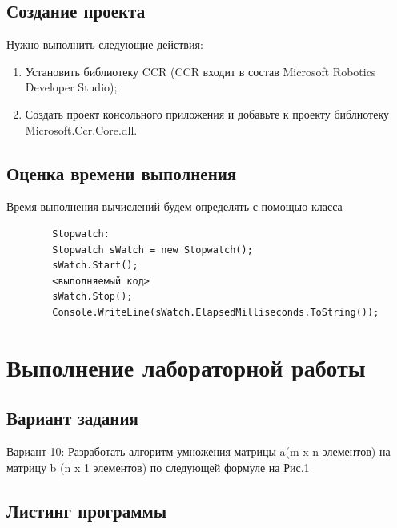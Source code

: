 \documentclass[russian,utf8,pointsection]{eskdtext}
\begin{document}
       \subsection{Создание проекта}
       Нужно выполнить следующие действия:
       \begin{enumerate}
       \item Установить библиотеку CCR (CCR входит в состав Microsoft Robotics Developer Studio);
       \item Создать проект консольного приложения и добавьте к проекту библиотеку Microsoft.Ccr.Core.dll.
       	\end{enumerate}
       	
       	\subsection{Оценка времени выполнения}
       	Время выполнения вычислений будем определять с помощью класса
       	\begin{lstlisting}
       	Stopwatch:       	
       	Stopwatch sWatch = new Stopwatch();       	
       	sWatch.Start();       	
       	<выполняемый код>       	
       	sWatch.Stop();       	
       	Console.WriteLine(sWatch.ElapsedMilliseconds.ToString());
       	      	\end{lstlisting}
       	
       	\section{Выполнение лабораторной работы}
       		\subsection{Вариант задания}
       		Вариант 10:
       		Разработать алгоритм умножения матрицы a(m x n элементов) на матрицу b (n x 1 элементов) по следующей формуле на Рис.1
       		
       		\begin{figure}[!h]
       			\caption{}
       			\label{ris:1-1}
       		\end{figure}

       	\subsection{Листинг программы}
       
\end{document}
